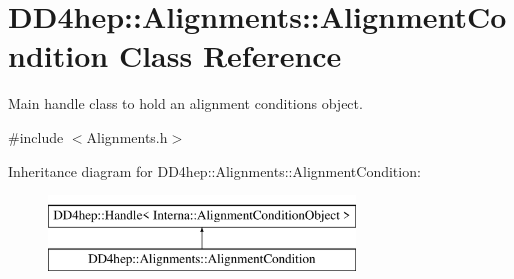 \hypertarget{class_d_d4hep_1_1_alignments_1_1_alignment_condition}{}\section{D\+D4hep\+:\+:Alignments\+:\+:Alignment\+Condition Class Reference}
\label{class_d_d4hep_1_1_alignments_1_1_alignment_condition}


Main handle class to hold an alignment conditions object.  




{\ttfamily \#include $<$Alignments.\+h$>$}

Inheritance diagram for D\+D4hep\+:\+:Alignments\+:\+:Alignment\+Condition\+:\begin{figure}[H]
\begin{center}
\leavevmode
\includegraphics[height=2.000000cm]{class_d_d4hep_1_1_alignments_1_1_alignment_condition}
\end{center}
\end{figure}
